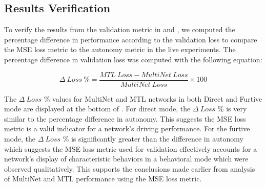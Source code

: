 \subsection{Results Verification}
To verify the results from the validation metric in  and , we computed the percentage difference in performance according to the validation loss to compare the MSE loss metric to the autonomy metric in the live experiments. The percentage difference in validation loss was computed with the following equation:

\begin{equation}
\Delta\ Loss\ \% = \dfrac{MTL\ Loss - MultiNet\ Loss}{MultiNet\ Loss} \times 100
\end{equation}

The $\Delta \ Loss$ \% values for MultiNet and MTL networks in both Direct and Furtive mode are displayed at the bottom of . For direct mode, the $\Delta \ Loss$ \% is very similar to the percentage difference in autonomy. This suggests the MSE loss metric is a valid indicator for a network's driving performance. For the furtive mode, the $\Delta \ Loss$ \% is significantly greater than the difference in autonomy which suggests the MSE loss metric used for validation effectively accounts for a network's display of characteristic behaviors in a behavioral mode which were observed qualitatively. This supports the conclusions made earlier from analysis of MultiNet and MTL performance using the MSE loss metric.
